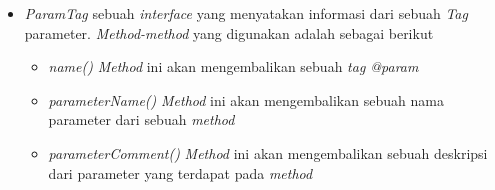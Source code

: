 \begin{itemize}
\begin{itemize}
	\end{itemize}
	\item {\it ParamTag}
	sebuah {\it interface} yang menyatakan informasi dari sebuah {\it Tag} parameter. {\it Method-method} yang digunakan adalah sebagai berikut
	\begin{itemize}
		\item {\it name()}
		{\it Method} ini akan mengembalikan sebuah {\it tag @param} 
		\item {\it parameterName()}
		{\it Method} ini akan mengembalikan sebuah nama parameter dari sebuah {\it method}
		\item {\it parameterComment()}
		{\it Method} ini akan mengembalikan sebuah deskripsi dari parameter yang terdapat pada {\it method}
	\end{itemize}
\end{itemize}

 
 



